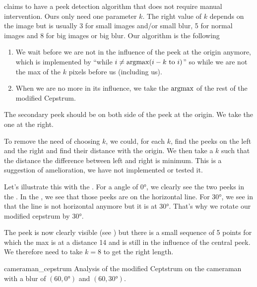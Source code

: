 \cite{Deshpande2014606} claims to have a peek detection
algorithm that does not require manual intervention.
Ours only need one parameter $k$.
The right value of $k$ depends on the image but is
usually 3 for small images and/or small blur,
5 for normal images and 8 for big images or big blur.
Our algorithm is the following 
\begin{enumerate}
  \item We wait before we are not in the influence of the peek
    at the origin anymore, which is implemented by
    ``while $i \neq \operatorname{argmax}(i-k\text{ to }i)$'' so
    while we are not the max of the $k$ pixels before us
    (including us).
  \item When we are no more in its influence, we take the
    $\operatorname{argmax}$ of the rest of the modified Cepstrum.
\end{enumerate}

The secondary peek should be on both side of the peek at the
origin.
We take the one at the right.

To remove the need of choosing $k$, we could,
for each $k$, find the peeks on the left and the right and
find their distance with the origin.
We then take a $k$ such that the distance
the difference between left and right is minimum.
This is a suggestion of amelioration,
we have not implemented or tested it.

Let's illustrate this with the .
For a angle of \ang{0}, we clearly see the two peeks
in the .
In the ,
we see that those peeks are on the horizontal line.
For \ang{30}, we see in 
that the line is not horizontal anymore but it is at \ang{30}.
That's why we rotate our modified cepstrum by \ang{30}.

The peek is now clearly visible (see ) but
there is a small sequence of 5 points for which the max is at a distance
14 and is still in the influence of the central peek.
We therefore need to take $k = 8$ to get the right length.

\begin{myfig}{cameraman_cepstrum}
  {Analysis of the modified Ceptstrum on the cameraman with a blur of $(60,\ang{0})$ and $(60,\ang{30})$.}
\end{myfig}
